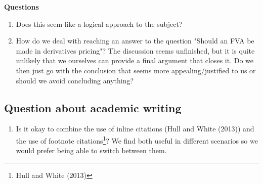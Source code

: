 \documentclass[10pt,a4paper]{article}
\begin{document}
        \textbf{Questions}
        \begin{enumerate}
            \item Does this seem like a logical approach to the subject?
            \item How do we deal with reaching an answer to the question "Should an FVA be made in derivatives pricing"? The discussion seems unfinished, but it is quite unlikely that we ourselves can provide a final argument that closes it. Do we then just go with the conclusion that seems more appealing/justified to us or should we avoid concluding anything?
        \end{enumerate}

    \subsection{Question about academic writing}
        \begin{enumerate}
            \item Is it okay to combine the use of inline citations (Hull and White (2013)) and the use of footnote citations\footnote{Hull and White (2013)}? We find both useful in different scenarios so we would prefer being able to switch between them.
        \end{enumerate}
\end{document}

